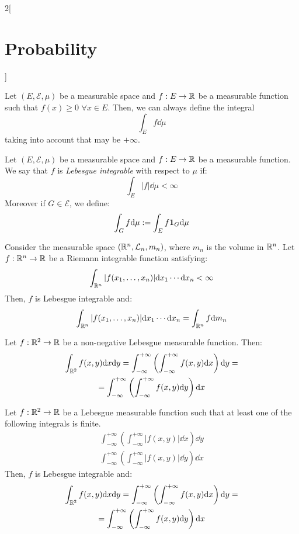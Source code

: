 \documentclass[../../../main.tex]{subfiles}
\begin{document}
\begin{multicols}{2}[\section{Probability}]
\begin{definition}
    \end{definition}
    \begin{prop}
        Let $(E,\mathcal{E},\mu)$ be a measurable space and $f:E\rightarrow\mathbb{R}$ be a measurable function such that $f(x)\geq 0$ $\forall x\in E$. Then, we can always define the integral $$\int_Ef\dd\mu$$ taking into account that may be $+\infty$.
    \end{prop}
    \begin{definition}
        Let $(E,\mathcal{E},\mu)$ be a measurable space and $f:E\rightarrow\mathbb{R}$ be a measurable function. We say that $f$ is \textit{Lebesgue integrable} with respect to $\mu$ if: $$\int_E|f|\dd\mu<\infty$$
        Moreover if $G\in\mathcal{E}$, we define: $$\int_Gf\dd\mu:=\int_Ef\boldsymbol{\mathrm{1}}_G\dd\mu$$
    \end{definition}
    \begin{prop}
        Consider the measurable space $(\mathbb{R}^n,\mathcal{L}_n,m_n)$, where $m_n$ is the volume in $\mathbb{R}^n$. Let $f:\mathbb{R}^n\rightarrow\mathbb{R}$ be a Riemann integrable function satisfying: $$\int_{\mathbb{R}^n}|f(x_1,\ldots,x_n)|\dd x_1\cdots\dd x_n<\infty$$
        Then, $f$ is Lebesgue integrable and: $$\int_{\mathbb{R}^n}|f(x_1,\ldots,x_n)|\dd x_1\cdots\dd x_n=\int_{\mathbb{R}^n}f\dd m_n$$
    \end{prop}
    \begin{theorem}
        Let $f:\mathbb{R}^2\rightarrow\mathbb{R}$ be a non-negative Lebesgue measurable function. Then:
        \begin{multline*}
            \int_{\mathbb{R}^2}f(x,y)\dd x\dd y=\int_{-\infty}^{+\infty}\left(\int_{-\infty}^{+\infty}f(x,y)\dd x\right)\dd y=\\=\int_{-\infty}^{+\infty}\left(\int_{-\infty}^{+\infty}f(x,y)\dd y\right)\dd x
        \end{multline*}
    \end{theorem}
    \begin{theorem}
        Let $f:\mathbb{R}^2\rightarrow\mathbb{R}$ be a Lebesgue measurable function such that at least one of the following integrals is finite.
        \begin{gather*}
            \int_{-\infty}^{+\infty}\left(\int_{-\infty}^{+\infty}|f(x,y)|\dd x\right)\dd y\\
            \int_{-\infty}^{+\infty}\left(\int_{-\infty}^{+\infty}|f(x,y)|\dd y\right)\dd x
        \end{gather*}
        Then, $f$ is Lebesgue integrable and:
        \begin{multline*}
            \int_{\mathbb{R}^2}f(x,y)\dd x\dd y=\int_{-\infty}^{+\infty}\left(\int_{-\infty}^{+\infty}f(x,y)\dd x\right)\dd y=\\=\int_{-\infty}^{+\infty}\left(\int_{-\infty}^{+\infty}f(x,y)\dd y\right)\dd x
        \end{multline*}
    \end{theorem}

\end{multicols}
\end{document}
